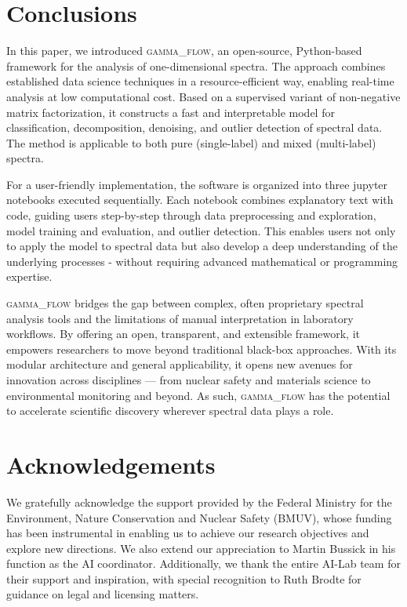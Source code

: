 \documentclass[preprint, 12pt, a4paper]{elsarticle}
\begin{document}
\section{Conclusions}
In this paper, we introduced \textsc{gamma\_flow}, an open-source, Python-based framework for the analysis of one-dimensional spectra. The approach combines established data science techniques in a resource-efficient way, enabling real-time analysis at low computational cost. Based on a supervised variant of non-negative matrix factorization, it constructs a fast and interpretable model for classification, decomposition, denoising, and outlier detection of spectral data. The method is applicable to both pure (single-label) and mixed (multi-label) spectra. 

For a user-friendly implementation, the software is organized into three jupyter notebooks executed sequentially. Each notebook combines explanatory text with code, guiding users step-by-step through data preprocessing and exploration, model training and evaluation, and outlier detection. This enables users not only to apply the model to spectral data but also develop a deep understanding of the underlying processes - without requiring advanced mathematical or programming expertise.  


\textsc{gamma\_flow} bridges the gap between complex, often proprietary spectral analysis tools and the limitations of manual interpretation in laboratory workflows. By offering an open, transparent, and extensible framework, it empowers researchers to move beyond traditional black-box approaches. With its modular architecture and general applicability, it opens new avenues for innovation across disciplines — from nuclear safety and materials science to environmental monitoring and beyond. As such, \textsc{gamma\_flow} has the potential to accelerate scientific discovery wherever spectral data plays a role.

\section*{Acknowledgements}
We gratefully acknowledge the support provided by the Federal Ministry for the Environment, Nature Conservation and Nuclear Safety (BMUV), whose funding has been instrumental in enabling us to achieve our research objectives and explore new directions. 
We also extend our appreciation to Martin Bussick in his function as the AI coordinator. 
Additionally, we thank the entire AI-Lab team for their support and inspiration, with special recognition to Ruth Brodte for guidance on legal and licensing matters.

 

\end{document}

